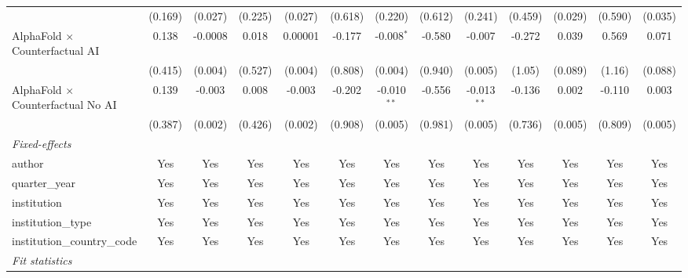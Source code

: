 \begin{tabular}{lcccccccccccc}
                                            & (0.169) & (0.027)      & (0.225) & (0.027)       & (0.618) & (0.220)       & (0.612)     & (0.241)       & (0.459)     & (0.029)        & (0.590)      & (0.035)\\   
   AlphaFold $\times$ Counterfactual AI     & 0.138   & -0.0008      & 0.018   & 0.00001       & -0.177  & -0.008$^{*}$  & -0.580      & -0.007        & -0.272      & 0.039          & 0.569        & 0.071\\   
                                            & (0.415) & (0.004)      & (0.527) & (0.004)       & (0.808) & (0.004)       & (0.940)     & (0.005)       & (1.05)      & (0.089)        & (1.16)       & (0.088)\\   
   AlphaFold $\times$ Counterfactual No AI  & 0.139   & -0.003       & 0.008   & -0.003        & -0.202  & -0.010$^{**}$ & -0.556      & -0.013$^{**}$ & -0.136      & 0.002          & -0.110       & 0.003\\   
                                            & (0.387) & (0.002)      & (0.426) & (0.002)       & (0.908) & (0.005)       & (0.981)     & (0.005)       & (0.736)     & (0.005)        & (0.809)      & (0.005)\\   
   \midrule
   \emph{Fixed-effects}\\
   author                                   & Yes     & Yes          & Yes     & Yes           & Yes     & Yes           & Yes         & Yes           & Yes         & Yes            & Yes          & Yes\\  
   quarter\_year                            & Yes     & Yes          & Yes     & Yes           & Yes     & Yes           & Yes         & Yes           & Yes         & Yes            & Yes          & Yes\\  
   institution                              & Yes     & Yes          & Yes     & Yes           & Yes     & Yes           & Yes         & Yes           & Yes         & Yes            & Yes          & Yes\\  
   institution\_type                        & Yes     & Yes          & Yes     & Yes           & Yes     & Yes           & Yes         & Yes           & Yes         & Yes            & Yes          & Yes\\  
   institution\_country\_code               & Yes     & Yes          & Yes     & Yes           & Yes     & Yes           & Yes         & Yes           & Yes         & Yes            & Yes          & Yes\\  
   \midrule
   \emph{Fit statistics}\\

\end{tabular}
